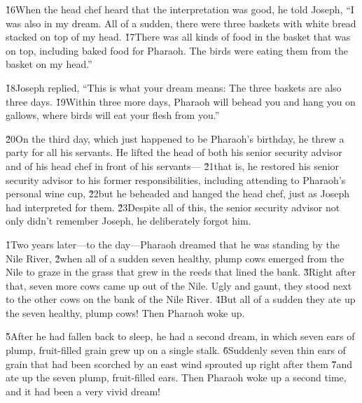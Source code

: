 \v{16}When the head chef heard that the interpretation was good, he told Joseph, ``I was also in my dream. All of a sudden, there were three baskets with white bread stacked on top of my head. \v{17}There was all kinds of food in the basket that was on top, including baked food for Pharaoh. The birds were eating them from the basket on my head.''

\v{18}Joseph replied, ``This is what your dream means: The three baskets are also three days. \v{19}Within three more days, Pharaoh will behead you and hang you on gallows, where birds will eat your flesh from you.''

\v{20}On the third day, which just happened to be Pharaoh's birthday, he threw a party for all his servants. He lifted the head of both his senior security advisor and of his head chef in front of his servants--- \v{21}that is, he restored his senior security advisor to his former responsibilities, including attending to Pharaoh's personal wine cup, \v{22}but he beheaded and hanged the head chef, just as Joseph had interpreted for them. \v{23}Despite all of this, the senior security advisor not only didn't remember Joseph, he deliberately forgot him.

\v{1}Two years later---to the day---Pharaoh dreamed that he was standing by the Nile River, \v{2}when all of a sudden seven healthy, plump cows emerged from the Nile to graze in the grass that grew in the reeds that lined the bank. \v{3}Right after that, seven more cows came up out of the Nile. Ugly and gaunt, they stood next to the other cows on the bank of the Nile River. \v{4}But all of a sudden they ate up the seven healthy, plump cows! Then Pharaoh woke up.

\v{5}After he had fallen back to sleep, he had a second dream, in which seven ears of plump, fruit-filled grain grew up on a single stalk. \v{6}Suddenly seven thin ears of grain that had been scorched by an east wind sprouted up right after them \v{7}and ate up the seven plump, fruit-filled ears. Then Pharaoh woke up a second time, and it had been a very vivid dream!

